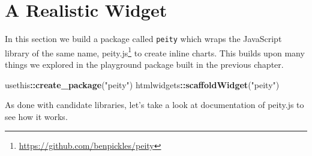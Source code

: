 \documentclass[
]{krantz}
\makeatletter
\newenvironment{Shaded}{\begin{snugshade}}{\end{snugshade}}
\newcommand{\AttributeTok}[1]{\textcolor[rgb]{0.61,0.61,0.61}{#1}}
\newcommand{\CommentTok}[1]{\textcolor[rgb]{0.37,0.37,0.37}{\textit{#1}}}
\newcommand{\DataTypeTok}[1]{\textcolor[rgb]{0.27,0.27,0.27}{#1}}
\newcommand{\KeywordTok}[1]{\textcolor[rgb]{0.27,0.27,0.27}{\textbf{#1}}}
\newcommand{\NormalTok}[1]{#1}
\newcommand{\OperatorTok}[1]{\textcolor[rgb]{0.43,0.43,0.43}{\textbf{#1}}}
\newcommand{\OtherTok}[1]{\textcolor[rgb]{0.37,0.37,0.37}{#1}}
\newcommand{\StringTok}[1]{\textcolor[rgb]{0.5,0.5,0.5}{#1}}
\renewcommand{\href}[2]{#2\footnote{\url{#1}}}
\newenvironment{kframe}{%
\medskip{}
\setlength{\fboxsep}{.8em}
 \def\at@end@of@kframe{}%
 \ifinner\ifhmode%
  \def\at@end@of@kframe{\end{minipage}}%
  \begin{minipage}{\columnwidth}%
 \fi\fi%
 \def\FrameCommand##1{\hskip\@totalleftmargin \hskip-\fboxsep
 \colorbox{shadecolor}{##1}\hskip-\fboxsep
     \hskip-\linewidth \hskip-\@totalleftmargin \hskip\columnwidth}%
 \MakeFramed {\advance\hsize-\width
   \@totalleftmargin\z@ \linewidth\hsize
   \@setminipage}}%
 {\par\unskip\endMakeFramed%
 \at@end@of@kframe}
\renewenvironment{Shaded}{\begin{kframe}}{\end{kframe}}
\makeatother
\begin{document}
\hypertarget{widgets-realistic}{%
\chapter{A Realistic Widget}\label{widgets-realistic}}

In this section we build a package called \texttt{peity} which wraps the JavaScript library of the same name, \href{https://github.com/benpickles/peity}{peity.js} to create inline charts. This builds upon many things we explored in the playground package built in the previous chapter.

\begin{Shaded}
\begin{Highlighting}[]
\NormalTok{usethis}\OperatorTok{::}\KeywordTok{create\_package}\NormalTok{(}\StringTok{"peity"}\NormalTok{)}
\NormalTok{htmlwidgets}\OperatorTok{::}\KeywordTok{scaffoldWidget}\NormalTok{(}\StringTok{"peity"}\NormalTok{)}
\end{Highlighting}
\end{Shaded}

As done with candidate libraries, let's take a look at documentation of peity.js to see how it works.

\begin{Shaded}
\end{Shaded}
\end{document}
